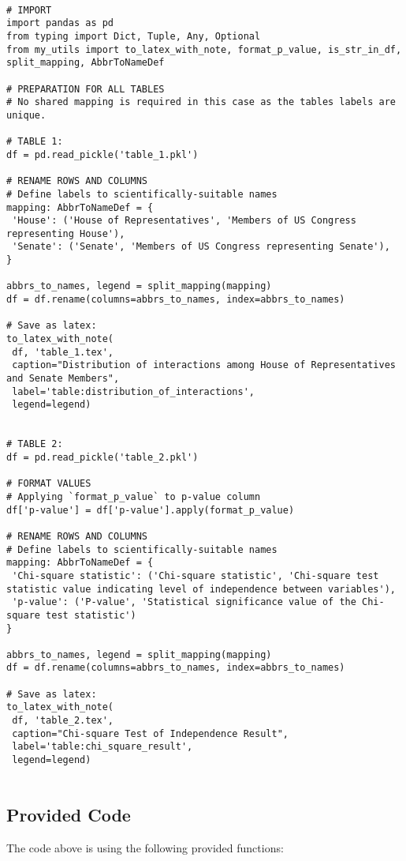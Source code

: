 \documentclass[11pt]{article}
\begin{document}
\begin{verbatim}

# IMPORT
import pandas as pd
from typing import Dict, Tuple, Any, Optional
from my_utils import to_latex_with_note, format_p_value, is_str_in_df, split_mapping, AbbrToNameDef

# PREPARATION FOR ALL TABLES
# No shared mapping is required in this case as the tables labels are unique.

# TABLE 1:
df = pd.read_pickle('table_1.pkl')

# RENAME ROWS AND COLUMNS 
# Define labels to scientifically-suitable names
mapping: AbbrToNameDef = {
 'House': ('House of Representatives', 'Members of US Congress representing House'),
 'Senate': ('Senate', 'Members of US Congress representing Senate'),   
}

abbrs_to_names, legend = split_mapping(mapping)
df = df.rename(columns=abbrs_to_names, index=abbrs_to_names)

# Save as latex:
to_latex_with_note(
 df, 'table_1.tex',
 caption="Distribution of interactions among House of Representatives and Senate Members", 
 label='table:distribution_of_interactions',
 legend=legend)


# TABLE 2:
df = pd.read_pickle('table_2.pkl')

# FORMAT VALUES 
# Applying `format_p_value` to p-value column
df['p-value'] = df['p-value'].apply(format_p_value)

# RENAME ROWS AND COLUMNS 
# Define labels to scientifically-suitable names
mapping: AbbrToNameDef = {
 'Chi-square statistic': ('Chi-square statistic', 'Chi-square test statistic value indicating level of independence between variables'),
 'p-value': ('P-value', 'Statistical significance value of the Chi-square test statistic')
}

abbrs_to_names, legend = split_mapping(mapping)
df = df.rename(columns=abbrs_to_names, index=abbrs_to_names)

# Save as latex:
to_latex_with_note(
 df, 'table_2.tex',
 caption="Chi-square Test of Independence Result", 
 label='table:chi_square_result',
 legend=legend)


\end{verbatim}

\subsection{Provided Code}
The code above is using the following provided functions:
\end{document}
